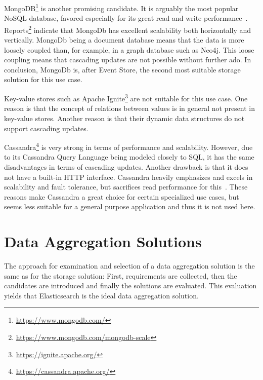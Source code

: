 MongoDB\footnote{\url{https://www.mongodb.com/}} is another promising candidate.
It is arguably the most popular NoSQL database, favored especially for its great read and write performance~\cite{6625441}.
Reports\footnote{\url{https://www.mongodb.com/mongodb-scale}} indicate that MongoDb has excellent scalability both horizontally and vertically.
MongoDb being a document database means that the data is more loosely coupled than, for example, in a graph database such as Neo4j.
This loose coupling means that cascading updates are not possible without further ado.
In conclusion, MongoDb is, after Event Store, the second most suitable storage solution for this use case.

Key-value stores such as Apache Ignite\footnote{\url{https://ignite.apache.org/}} are not suitable for this use case.
One reason is that the concept of relations between values is in general not present in key-value stores.
Another reason is that their dynamic data structures do not support cascading updates.

Cassandra\footnote{\url{https://cassandra.apache.org/}} is very strong in terms of performance and scalability.
However, due to its Cassandra Query Language being modeled closely to \ac{SQL}, it has the same disadvantages in terms of cascading updates.
Another drawback is that it does not have a built-in HTTP interface.
Cassandra heavily emphasizes and excels in scalability and fault tolerance, but sacrifices read performance for this~\cite{6625441}.
These reasons make Cassandra a great choice for certain specialized use cases, but seems less suitable for a general purpose application and thus it is not used here.

\section{Data Aggregation Solutions}
\label{sec:classifications:aggregation}

The approach for examination and selection of a data aggregation solution is the same as for the storage solution:
First, requirements are collected, then the candidates are introduced and finally the solutions are evaluated.
This evaluation yields that Elasticsearch is the ideal data aggregation solution.



